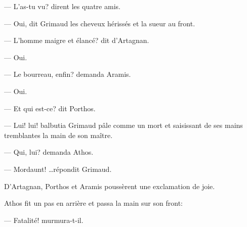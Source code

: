 — L'as-tu vu? dirent les quatre amis.

— Oui, dit Grimaud les cheveux hérissés et la sueur au front.

— L'homme maigre et élancé? dit d'Artagnan.

— Oui.

— Le bourreau, enfin? demanda Aramis.

— Oui.

— Et qui est-ce? dit Porthos.

— Lui! lui! balbutia Grimaud pâle comme un mort et saisissant de ses mains tremblantes la main de son maître.

— Qui, lui? demanda Athos.

— Mordaunt! \dots répondit Grimaud.

D'Artagnan, Porthos et Aramis poussèrent une exclamation de joie.

Athos fit un pas en arrière et passa la main sur son front:

— Fatalité! murmura-t-il.